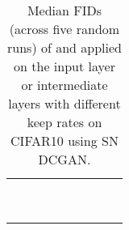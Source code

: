 \documentclass{article}
\begin{document}
\begin{center}
\begin{table}[t!]
	\vspace{-1em}
	\setlength{\tabcolsep}{0.22em} 
	\renewcommand{\arraystretch}{1.1}
\centering
	\caption{Median FIDs (across five random runs) of  and  applied on the input layer or intermediate layers with different keep rates on CIFAR10 using SN DCGAN.} \label{table:dropout}\vspace{0.5em}
\begin{tabular}{c|cccc|cccc} 
	\rowcolor{verylightgray}
	&    \multicolumn{4}{c}{\footnotesize{}{\text{}}} &  \multicolumn{4}{c}{\footnotesize{}{\text{}}}  \tabularnewline 
		\rowcolor{verylightgray}
	\multirow{-2}{*}{\footnotesize{}{\text{}} } &\footnotesize{}{\text{}} & \footnotesize{}{\text{}} & \footnotesize{}{\text{}} & \footnotesize{}{\text{}}&\footnotesize{}{\text{}} & \footnotesize{}{\text{}} & \footnotesize{}{\text{}} & \footnotesize{}{\text{}} \tabularnewline 
	\footnotesize{}{\text{}} & \multicolumn{8}{c}{\text{\footnotesize}} \tabularnewline
	\arrayrulecolor{verylightgray}	\hline 
	\footnotesize{}{\text{}} & \text{\footnotesize} &  \text{\footnotesize} &  \text{\footnotesize} &  \text{\footnotesize} & 
									 \text{\footnotesize} &  \text{\footnotesize} &  \text{\footnotesize} &  \text{\footnotesize} \tabularnewline 
	\footnotesize{}{\text{}}  & \text{\footnotesize} &  \text{\footnotesize} &  \text{\footnotesize} &  \text{\footnotesize} & 
	                                 \text{\footnotesize} &  \text{\footnotesize} &  \text{\footnotesize} &  \text{\footnotesize} \tabularnewline 
	\footnotesize{}{\text{}} & \text{\footnotesize} &  \text{\footnotesize} &  \text{\footnotesize} &  \text{\footnotesize} &
	                                \text{\footnotesize} &  \text{\footnotesize} &  \text{\footnotesize} &  \text{\footnotesize} \tabularnewline 
	\footnotesize{}{\text{}} & \text{\footnotesize} &  \text{\footnotesize} &  \text{\footnotesize} &  \text{\footnotesize} & 
									\text{\footnotesize} &  \text{\footnotesize} &  \text{\footnotesize} &  \text{\footnotesize}\tabularnewline 
	\footnotesize{}{\text{}} & \text{\footnotesize} &  \text{\footnotesize} &  \text{\footnotesize} &  \text{\footnotesize} & 
	                                \text{\footnotesize} &  \text{\footnotesize} &  \text{\footnotesize} &  \text{\footnotesize} \tabularnewline 
	\footnotesize{}{\text{}} & \text{\footnotesize} &  \text{\footnotesize} &  \text{\footnotesize} &  \text{\footnotesize} & 
	                                 \text{\footnotesize} &  \text{\footnotesize} &  \text{\footnotesize} &  \text{\footnotesize}  \tabularnewline 
\end{tabular}
\end{table}




\end{center}
\end{document}
